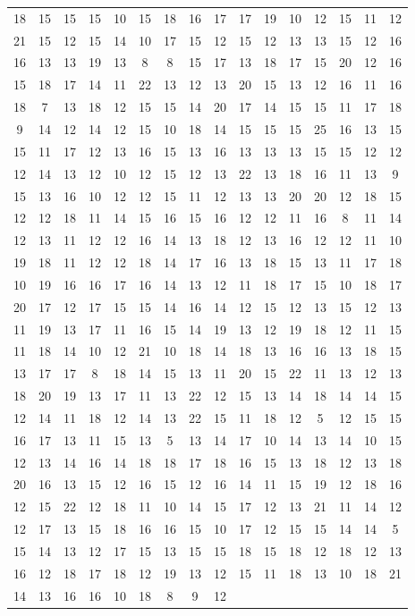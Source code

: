 \documentclass[a4paper]{article}
\begin{document}
\begin{longtable}{ c c c c c c c c c c c c c c c c }
	18 & 15 & 15 & 15 & 10 & 15 & 18 & 16 & 17 & 17 & 19 & 10 & 12 & 15 & 11 & 12 \\
	21 & 15 & 12 & 15 & 14 & 10 & 17 & 15 & 12 & 15 & 12 & 13 & 13 & 15 & 12 & 16 \\
	16 & 13 & 13 & 19 & 13 & 8 & 8 & 15 & 17 & 13 & 18 & 17 & 15 & 20 & 12 & 16 \\
	15 & 18 & 17 & 14 & 11 & 22 & 13 & 12 & 13 & 20 & 15 & 13 & 12 & 16 & 11 & 16 \\
	18 & 7 & 13 & 18 & 12 & 15 & 15 & 14 & 20 & 17 & 14 & 15 & 15 & 11 & 17 & 18 \\
	9 & 14 & 12 & 14 & 12 & 15 & 10 & 18 & 14 & 15 & 15 & 15 & 25 & 16 & 13 & 15 \\
	15 & 11 & 17 & 12 & 13 & 16 & 15 & 13 & 16 & 13 & 13 & 13 & 15 & 15 & 12 & 12 \\
	12 & 14 & 13 & 12 & 10 & 12 & 15 & 12 & 13 & 22 & 13 & 18 & 16 & 11 & 13 & 9 \\
	15 & 13 & 16 & 10 & 12 & 12 & 15 & 11 & 12 & 13 & 13 & 20 & 20 & 12 & 18 & 15 \\
	12 & 12 & 18 & 11 & 14 & 15 & 16 & 15 & 16 & 12 & 12 & 11 & 16 & 8 & 11 & 14 \\
	12 & 13 & 11 & 12 & 12 & 16 & 14 & 13 & 18 & 12 & 13 & 16 & 12 & 12 & 11 & 10 \\
	19 & 18 & 11 & 12 & 12 & 18 & 14 & 17 & 16 & 13 & 18 & 15 & 13 & 11 & 17 & 18 \\
	10 & 19 & 16 & 16 & 17 & 16 & 14 & 13 & 12 & 11 & 18 & 17 & 15 & 10 & 18 & 17 \\
	20 & 17 & 12 & 17 & 15 & 15 & 14 & 16 & 14 & 12 & 15 & 12 & 13 & 15 & 12 & 13 \\
	11 & 19 & 13 & 17 & 11 & 16 & 15 & 14 & 19 & 13 & 12 & 19 & 18 & 12 & 11 & 15 \\
	11 & 18 & 14 & 10 & 12 & 21 & 10 & 18 & 14 & 18 & 13 & 16 & 16 & 13 & 18 & 15 \\
	13 & 17 & 17 & 8 & 18 & 14 & 15 & 13 & 11 & 20 & 15 & 22 & 11 & 13 & 12 & 13 \\
	18 & 20 & 19 & 13 & 17 & 11 & 13 & 22 & 12 & 15 & 13 & 14 & 18 & 14 & 14 & 15 \\
	12 & 14 & 11 & 18 & 12 & 14 & 13 & 22 & 15 & 11 & 18 & 12 & 5 & 12 & 15 & 15 \\
	16 & 17 & 13 & 11 & 15 & 13 & 5 & 13 & 14 & 17 & 10 & 14 & 13 & 14 & 10 & 15 \\
	12 & 13 & 14 & 16 & 14 & 18 & 18 & 17 & 18 & 16 & 15 & 13 & 18 & 12 & 13 & 18 \\
	20 & 16 & 13 & 15 & 12 & 16 & 15 & 12 & 16 & 14 & 11 & 15 & 19 & 12 & 18 & 16 \\
	12 & 15 & 22 & 12 & 18 & 11 & 10 & 14 & 15 & 17 & 12 & 13 & 21 & 11 & 14 & 12 \\
	12 & 17 & 13 & 15 & 18 & 16 & 16 & 15 & 10 & 17 & 12 & 15 & 15 & 14 & 14 & 5 \\
	15 & 14 & 13 & 12 & 17 & 15 & 13 & 15 & 15 & 18 & 15 & 18 & 12 & 18 & 12 & 13 \\
	16 & 12 & 18 & 17 & 18 & 12 & 19 & 13 & 12 & 15 & 11 & 18 & 13 & 10 & 18 & 21 \\
	14 & 13 & 16 & 16 & 10 & 18 & 8 & 9 & 12 \\
\end{longtable}
\end{document}
